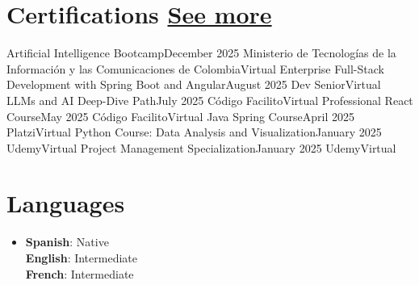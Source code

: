 \documentclass[letterpaper,12pt]{fed-res} %
\begin{document}
\section{Certifications \hfill \href{https://drive.google.com/file/d/1PQ2nJdswRsUy1RTMk97yJtt6K8QXSgmN/view?usp=sharing}{See more}}
    \resumeSubHeadingListStart
        \resumeSubheading
            {Artificial Intelligence Bootcamp}{December 2025}
            {Ministerio de Tecnologías de la Información y las Comunicaciones de Colombia}{Virtual}
        \resumeSubheading
            {Enterprise Full-Stack Development with Spring Boot and Angular}{August 2025}
            {Dev Senior}{Virtual}
        \resumeSubheading
            {LLMs and AI Deep-Dive Path}{July 2025}
            {Código Facilito}{Virtual}
        \resumeSubheading
            {Professional React Course}{May 2025}
            {Código Facilito}{Virtual}
        \resumeSubheading
            {Java Spring Course}{April 2025}
            {Platzi}{Virtual}
        \resumeSubheading
            {Python Course: Data Analysis and Visualization}{January 2025}
            {Udemy}{Virtual}
        \resumeSubheading
            {Project Management Specialization}{January 2025}
            {Udemy}{Virtual}
    \resumeSubHeadingListEnd

\section{Languages}
 \begin{itemize}[leftmargin=0.15in, label={}]
    \item{
        \textbf{Spanish}{: Native} \\
        \textbf{English}{: Intermediate} \\
        \textbf{French}{: Intermediate}
    }
 \end{itemize}

\end{document}
